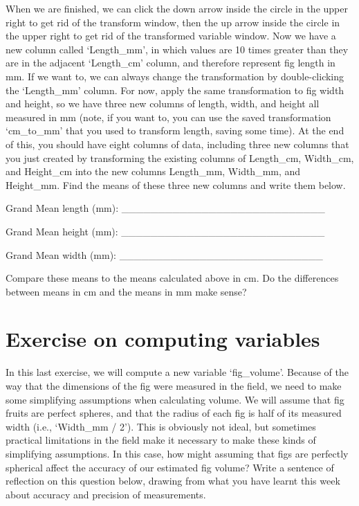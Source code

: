 \documentclass[
  openany]{krantz}
\begin{document}
When we are finished, we can click the down arrow inside the circle in the upper right to get rid of the transform window, then the up arrow inside the circle in the upper right to get rid of the transformed variable window.
Now we have a new column called `Length\_mm', in which values are 10 times greater than they are in the adjacent `Length\_cm' column, and therefore represent fig length in mm.
If we want to, we can always change the transformation by double-clicking the `Length\_mm' column.
For now, apply the same transformation to fig width and height, so we have three new columns of length, width, and height all measured in mm (note, if you want to, you can use the saved transformation `cm\_to\_mm' that you used to transform length, saving some time).
At the end of this, you should have eight columns of data, including three new columns that you just created by transforming the existing columns of Length\_cm, Width\_cm, and Height\_cm into the new columns Length\_mm, Width\_mm, and Height\_mm.
Find the means of these three new columns and write them below.

Grand Mean length (mm): \_\_\_\_\_\_\_\_\_\_\_\_\_\_\_\_\_\_\_\_\_\_\_\_\_\_\_\_

Grand Mean height (mm): \_\_\_\_\_\_\_\_\_\_\_\_\_\_\_\_\_\_\_\_\_\_\_\_\_\_\_\_

Grand Mean width (mm): \_\_\_\_\_\_\_\_\_\_\_\_\_\_\_\_\_\_\_\_\_\_\_\_\_\_\_\_

Compare these means to the means calculated above in cm.
Do the differences between means in cm and the means in mm make sense?

\hypertarget{computing_variables_02}{%
\section{Exercise on computing variables}\label{computing_variables_02}}

In this last exercise, we will compute a new variable `fig\_volume'.
Because of the way that the dimensions of the fig were measured in the field, we need to make some simplifying assumptions when calculating volume.
We will assume that fig fruits are perfect spheres, and that the radius of each fig is half of its measured width (i.e., `Width\_mm / 2').
This is obviously not ideal, but sometimes practical limitations in the field make it necessary to make these kinds of simplifying assumptions.
In this case, how might assuming that figs are perfectly spherical affect the accuracy of our estimated fig volume?
Write a sentence of reflection on this question below, drawing from what you have learnt this week about accuracy and precision of measurements.
\end{document}
